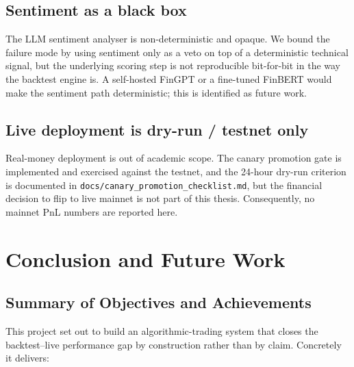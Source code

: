 \documentclass[a4paper, 12pt, titlepage]{article}
\begin{document}
\subsection*{Sentiment as a black box}

The LLM sentiment analyser is non-deterministic and opaque. We bound
the failure mode by using sentiment only as a veto on top of a
deterministic technical signal, but the underlying scoring step is
not reproducible bit-for-bit in the way the backtest engine is. A
self-hosted FinGPT or a fine-tuned FinBERT would make the sentiment
path deterministic; this is identified as future work.

\subsection*{Live deployment is dry-run / testnet only}

Real-money deployment is out of academic scope. The canary
promotion gate is implemented and exercised against the testnet,
and the 24-hour dry-run criterion is documented in
\texttt{docs/canary\_promotion\_checklist.md}, but the financial
decision to flip to live mainnet is not part of this thesis.
Consequently, no mainnet PnL numbers are reported here.

\newpage
\section{Conclusion and Future Work}

\subsection{Summary of Objectives and Achievements}

This project set out to build an algorithmic-trading system that
closes the backtest--live performance gap by construction rather
than by claim. Concretely it delivers:
\end{document}
